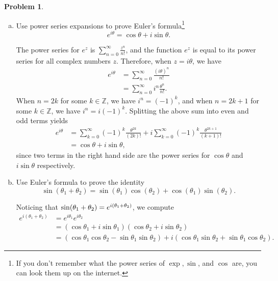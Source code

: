 \documentclass[11pt,oneside]{amsart}
\theoremstyle{definition}
\newtheorem{problem}{Problem}
\newcommand{\bZ}{\mathbb{Z}}
\let\Im\relax
\DeclareMathOperator{\Im}{Im}
\begin{document}
    \begin{problem}
        \hfill\begin{enumerate}[(a)]
            \item Use power series expansions to prove Euler's formula\footnote{If you don't remember what the power series of $\exp,\sin$, and $\cos$ are, you can look them up on the internet.}
            \[e^{i\theta}=\cos\theta+i\sin\theta.\]
            \begin{solution}
                The power series for $e^z$ is $\sum_{n=0}^\infty \frac{z^n}{n!}$, and the function $e^z$ is equal to its power series for all complex numbers $z$. Therefore, when $z=i\theta$, we have
                \[\begin{split}
                    e^{i\theta} &= \sum_{n=0}^\infty \frac{(i\theta)^n}{n!}\\
                    &= \sum_{n=0}^\infty i^n\frac{\theta^n}{n!}.
                \end{split}\]
                When $n=2k$ for some $k\in\bZ$, we have $i^n=(-1)^k$, and when $n=2k+1$ for some $k\in\bZ$, we have $i^n=i(-1)^k$. Splitting the above sum into even and odd terms yields
                \[\begin{split}
                    e^{i\theta} &= \sum_{k=0}^\infty (-1)^k\frac{\theta^{2k}}{(2k)!}+i\sum_{k=0}^\infty (-1)^k\frac{\theta^{2k+1}}{(k+1)!}\\
                    &= \cos\theta+i\sin\theta,
                \end{split}\]
                since two terms in the right hand side are the power series for $\cos\theta$ and $i\sin\theta$ respectively.
            \end{solution}
            \item Use Euler's formula to prove the identity
            \[\sin(\theta_1+\theta_2)=\sin(\theta_1)\cos(\theta_2)+\cos(\theta_1)\sin(\theta_2).\]
            \begin{solution}
                Noticing that $\sin(\theta_1+\theta_2)=\Im e^{i(\theta_1+\theta_2)}$, we compute
                \[\begin{split}
                    e^{i(\theta_1+\theta_2)} &= e^{i\theta_1}e^{i\theta_2}\\
                    &= (\cos\theta_1+i\sin\theta_1)(\cos\theta_2+i\sin\theta_2)\\
                    &= (\cos\theta_1\cos\theta_2-\sin\theta_1\sin\theta_2)+i(\cos\theta_1\sin\theta_2+\sin\theta_1\cos\theta_2).
                \end{split}\]

\end{solution}
\end{enumerate}
\end{problem}
\end{document}

